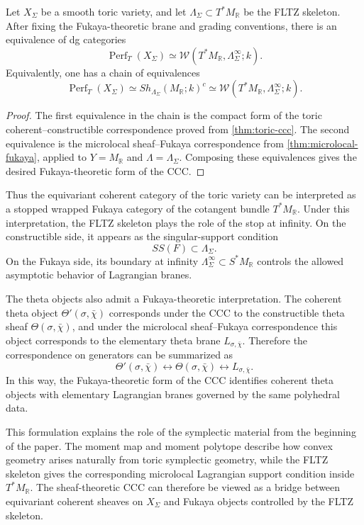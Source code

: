 \begin{corollary}
Let \(X_\Sigma\) be a smooth toric variety, and let
\(\Lambda_\Sigma\subset T^*M_{\mathbb R}\) be the FLTZ skeleton. After fixing
the Fukaya-theoretic brane and grading conventions, there is an equivalence
of dg categories
\[
\operatorname{Perf}_T(X_\Sigma)
\simeq
\mathcal W(T^*M_{\mathbb R},\Lambda_\Sigma^\infty;k).
\]
Equivalently, one has a chain of equivalences
\[
\operatorname{Perf}_T(X_\Sigma)
\simeq
Sh_{\Lambda_\Sigma}(M_{\mathbb R};k)^c
\simeq
\mathcal W(T^*M_{\mathbb R},\Lambda_\Sigma^\infty;k).
\]
\end{corollary}

\begin{proof}
The first equivalence in the chain is the compact form of the toric
coherent--constructible correspondence proved from \cref{thm:toric-ccc}. The second
equivalence is the microlocal sheaf--Fukaya correspondence from \cref{thm:microlocal-fukaya},
applied to \(Y=M_{\mathbb R}\) and
\(\Lambda=\Lambda_\Sigma\). Composing these equivalences gives the desired
Fukaya-theoretic form of the CCC.
\end{proof}

Thus the equivariant coherent category of the toric variety can be interpreted
as a stopped wrapped Fukaya category of the cotangent bundle
\(T^*M_{\mathbb R}\). Under this interpretation, the FLTZ skeleton plays the
role of the stop at infinity. On the constructible side, it appears as the
singular-support condition
\[
SS(F)\subset\Lambda_\Sigma.
\]
On the Fukaya side, its boundary at infinity
\(\Lambda_\Sigma^\infty\subset S^*M_{\mathbb R}\) controls the allowed
asymptotic behavior of Lagrangian branes.

The theta objects also admit a Fukaya-theoretic interpretation. The coherent
theta object \(\Theta'(\sigma,\bar\chi)\) corresponds under the CCC to the
constructible theta sheaf \(\Theta(\sigma,\bar\chi)\), and under the
microlocal sheaf--Fukaya correspondence this object corresponds to the
elementary theta brane \(L_{\sigma,\bar\chi}\). Therefore the correspondence
on generators can be summarized as
\[
\Theta'(\sigma,\bar\chi)
\longleftrightarrow
\Theta(\sigma,\bar\chi)
\longleftrightarrow
L_{\sigma,\bar\chi}.
\]
In this way, the Fukaya-theoretic form of the CCC identifies coherent theta
objects with elementary Lagrangian branes governed by the same polyhedral
data.

This formulation explains the role of the symplectic material from the
beginning of the paper. The moment map and moment polytope describe how
convex geometry arises naturally from toric symplectic geometry, while the
FLTZ skeleton gives the corresponding microlocal Lagrangian support condition
inside \(T^*M_{\mathbb R}\). The sheaf-theoretic CCC can therefore be viewed
as a bridge between equivariant coherent sheaves on \(X_\Sigma\) and Fukaya
objects controlled by the FLTZ skeleton.